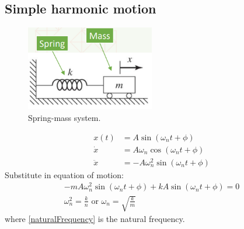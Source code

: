 \subsection{Simple harmonic motion}
\begin{figure}[H]
    \centering
    \includegraphics[width = 0.5\textwidth]{./img/diagram1.jpg}
    \caption{Spring-mass system.}
\end{figure}
\begin{align}
    x(t)     & = A \sin\left(\omega_n t + \phi\right)               \\
    \dot{x}  & = A \omega_n \cos \left(\omega_n t + \phi\right)     \\
    \ddot{x} & = - A \omega_n^2 \sin \left(\omega_n t + \phi\right)
\end{align}
Substitute in equation of motion:
\begin{gather}
    -m A \omega_n^2 \sin\left(\omega_n t + \phi\right) + k A \sin \left(\omega_n t + \phi \right) = 0\\
    \omega_n^2 = \frac{k}{n} \textrm{ or } \omega_n = \sqrt{\frac{k}{m}} \label{naturalFrequency}
\end{gather}
where \ref{naturalFrequency} is the natural frequency.
